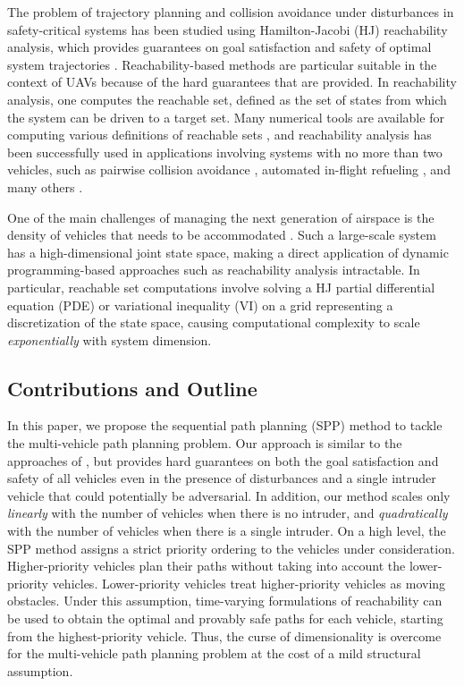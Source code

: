The problem of trajectory planning and collision avoidance under disturbances in safety-critical systems has been studied using Hamilton-Jacobi (HJ) reachability analysis, which provides guarantees on goal satisfaction and safety of optimal system trajectories \cite{Barron90, Mitchell05, Bokanowski10, Bokanowski11, Margellos11, Fisac15}. Reachability-based methods are particular suitable in the context of UAVs because of the hard guarantees that are provided. In reachability analysis, one computes the reachable set, defined as the set of states from which the system can be driven to a target set. Many numerical tools are available for computing various definitions of reachable sets \cite{Sethian96, Osher02, Mitchell02, Mitchell07b}, and reachability analysis has been successfully used in applications involving systems with no more than two vehicles, such as pairwise collision avoidance \cite{Mitchell05}, automated in-flight refueling \cite{Ding08}, and many others \cite{Huang11, Bayen07}.

One of the main challenges of managing the next generation of airspace is the density of vehicles that needs to be accommodated \cite{Kopardekar16}. Such a large-scale system has a high-dimensional joint state space, making a direct application of dynamic programming-based approaches such as reachability analysis intractable. In particular, reachable set computations involve solving a HJ partial differential equation (PDE) or variational inequality (VI) on a grid representing a discretization of the state space, causing computational complexity to scale \textit{exponentially} with system dimension.

\subsection{Contributions and Outline}

In this paper, we propose the sequential path planning (SPP) method to tackle the multi-vehicle path planning problem. Our approach is similar to the approaches of \cite{Erdmann1987, VandenBerg2005}, but provides hard guarantees on both the goal satisfaction and safety of all vehicles even in the presence of disturbances and a single intruder vehicle that could potentially be adversarial. In addition, our method scales only \textit{linearly} with the number of vehicles when there is no intruder, and \textit{quadratically} with the number of vehicles when there is a single intruder. On a high level, the SPP method assigns a strict priority ordering to the vehicles under consideration. Higher-priority vehicles plan their paths without taking into account the lower-priority vehicles. Lower-priority vehicles treat higher-priority vehicles as moving obstacles. Under this assumption, time-varying formulations of reachability \cite{Bokanowski11, Fisac15} can be used to obtain the optimal and provably safe paths for each vehicle, starting from the highest-priority vehicle. Thus, the curse of dimensionality is overcome for the multi-vehicle path planning problem at the cost of a mild structural assumption. 

